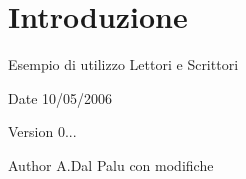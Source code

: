 \hypertarget{index_intro}{}\section{Introduzione}\label{index_intro}
Esempio di utilizzo Lettori e Scrittori

\begin{DoxyDate}{Date}
10/05/2006 
\end{DoxyDate}
\begin{DoxyVersion}{Version}
0... 
\end{DoxyVersion}
\begin{DoxyAuthor}{Author}
A.\+Dal Palu con modifiche 
\end{DoxyAuthor}
